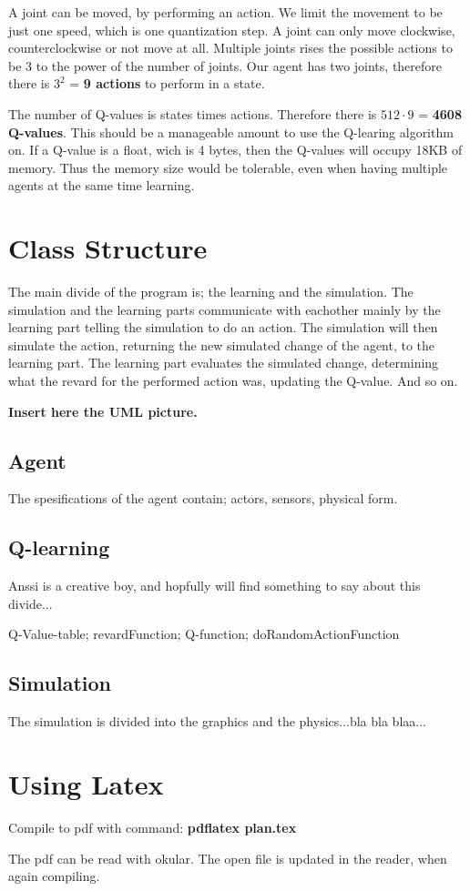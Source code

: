 \documentclass{article}
\begin{document}
A joint can be moved, by performing an action. We limit the movement to be
just one speed, which is one quantization step. A joint can only move
clockwise, counterclockwise or not move at all. Multiple joints rises the
possible actions to be 3 to the power of the number of joints. Our
agent has two joints, therefore there is $3^2$ = \textbf{9 actions} to
perform in a state.

The number of Q-values is states times actions. Therefore there is
$512 \cdot 9$ = \textbf{4608 Q-values}. This should be a manageable
amount to use the Q-learing algorithm on. If a Q-value is a float,
wich is 4 bytes, then the Q-values will occupy 18KB of memory.
Thus the memory size would be tolerable, even when having multiple agents
at the same time learning.


\section{Class Structure}
The main divide of the program is; the learning and the simulation. The
simulation and the learning parts communicate with eachother mainly by the
learning part telling the simulation to do an action. The simulation will then
simulate the action, returning the new simulated change of the agent, to the
learning part. The learning part evaluates the simulated change, determining
what the revard for the performed action was, updating the Q-value.
And so on.

\textbf{Insert here the UML picture.}


\subsection{Agent}
The spesifications of the agent contain; actors, sensors, physical form.


\subsection{Q-learning}
Anssi is a creative boy, and hopfully will find something to say about this
divide...

Q-Value-table; revardFunction; Q-function; doRandomActionFunction


\subsection{Simulation}
The simulation is divided into the graphics and the physics...bla bla blaa...


\newpage

\section{Using Latex}
Compile to pdf with command: \textbf{pdflatex plan.tex}

The pdf can be read with okular.
The open file is updated in the reader, when again compiling.
\end{document}
